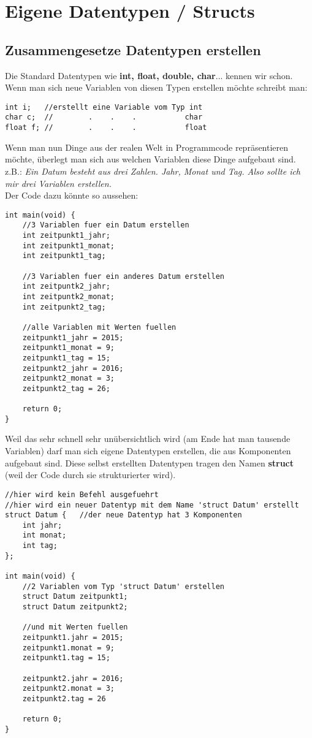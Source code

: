\documentclass[c_worksheet.tex]{subfiles}
\begin{document}
  
\chapter{Eigene Datentypen / Structs}

\section{Zusammengesetze Datentypen erstellen}

Die Standard Datentypen wie \textbf{int, float, double, char}... kennen wir schon. Wenn man sich neue Variablen von diesen Typen erstellen möchte schreibt man:
\begin{lstlisting}
int i;   //erstellt eine Variable vom Typ int
char c;  //        .    .    .           char
float f; //        .    .    .           float
\end{lstlisting}

Wenn man nun Dinge aus der realen Welt in Programmcode repräsentieren möchte, überlegt man sich aus welchen Variablen diese Dinge aufgebaut sind.\\
z.B.: \textit{Ein Datum besteht aus drei Zahlen. Jahr, Monat und Tag. Also sollte ich mir drei Variablen erstellen.} \\

Der Code dazu könnte so aussehen:
\begin{lstlisting}
int main(void) {
    //3 Variablen fuer ein Datum erstellen
    int zeitpunkt1_jahr;
    int zeitpunkt1_monat;
    int zeitpunkt1_tag;

    //3 Variablen fuer ein anderes Datum erstellen
    int zeitpuntk2_jahr;
    int zeitpuntk2_monat;
    int zeitpunkt2_tag;

    //alle Variablen mit Werten fuellen
    zeitpunkt1_jahr = 2015;
    zeitpunkt1_monat = 9;
    zeitpunkt1_tag = 15;
    zeitpunkt2_jahr = 2016;
    zeitpunkt2_monat = 3;
    zeitpunkt2_tag = 26;

    return 0;
}
\end{lstlisting}

Weil das sehr schnell sehr unübersichtlich wird (am Ende hat man tausende Variablen) darf man sich eigene Datentypen erstellen, die aus Komponenten aufgebaut sind.
Diese selbst erstellten Datentypen tragen den Namen \textbf{struct} (weil der Code durch sie strukturierter wird).

\begin{lstlisting}
//hier wird kein Befehl ausgefuehrt
//hier wird ein neuer Datentyp mit dem Name 'struct Datum' erstellt
struct Datum {   //der neue Datentyp hat 3 Komponenten
    int jahr;
    int monat;
    int tag;
};

int main(void) {
    //2 Variablen vom Typ 'struct Datum' erstellen
    struct Datum zeitpunkt1;
    struct Datum zeitpunkt2;

    //und mit Werten fuellen
    zeitpunkt1.jahr = 2015;
    zeitpunkt1.monat = 9;
    zeitpunkt1.tag = 15;

    zeitpunkt2.jahr = 2016;
    zeitpunkt2.monat = 3;
    zeitpunkt2.tag = 26

    return 0;
}
\end{lstlisting}
\end{document}
